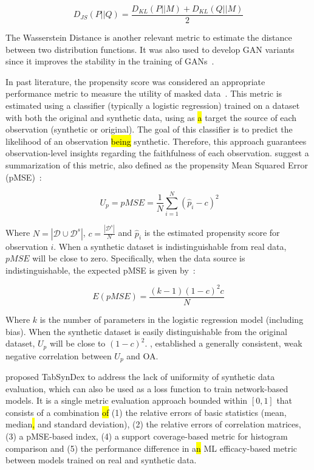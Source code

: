 \begin{equation}
    D_{JS}(P||Q) = \frac{D_{KL}(P||M) + D_{KL}(Q||M)}{2}
\end{equation}

The Wasserstein Distance is another relevant metric to estimate the
distance between two distribution functions. It was also used to develop GAN
variants since it improves the stability in the training of
GANs~\cite{gulrajani2017improved, goncalves2020generation}.

In past literature, the propensity score was considered an appropriate
performance metric to measure the utility of masked data~\cite{woo2009global}.
This metric is estimated using a classifier (typically a logistic regression)
trained on a dataset with both the original and synthetic data, using as \hl{a}
target the source of each observation (synthetic or original). The goal of
this classifier is to predict the likelihood of an observation \hl{being}
synthetic. Therefore, this approach guarantees observation-level insights
regarding the faithfulness of each observation. \cite{woo2009global} suggest
a summarization of this metric, also defined as the propensity Mean Squared Error
(pMSE)~\cite{chundawat2022tabsyndex}:

\begin{equation}~\label{ep:propensity}
    U_p = pMSE = \frac{1}{N} \sum^N_{i=1}{(\hat{p}_i - c)}^2
\end{equation}

Where $N = |\mathcal{D} \cup \mathcal{D}^s|$, $c = \frac{|\mathcal{D}^s|}{N}$
and $\hat{p}_i$ is the estimated propensity score for observation $i$. When a
synthetic dataset is indistinguishable from real data, $pMSE$ will be close to
zero. Specifically, when the data source is indistinguishable, the expected
pMSE is given by~\cite{snoke2018general}:

\begin{equation}
    E(pMSE) = \frac{(k-1)(1-c)^2c}{N}
\end{equation}

Where $k$ is the number of parameters in the logistic regression model
(including bias). When the synthetic dataset is easily distinguishable from
the original dataset, $U_p$ will be close to ${(1-c)}^2$.
\cite{dankar2021fake}, established a generally consistent, weak negative
correlation between $U_p$ and OA\@.

\cite{chundawat2022tabsyndex} proposed TabSynDex to address the lack of
uniformity of synthetic data evaluation, which can also be used as a loss
function to train network-based models. It is a single metric evaluation
approach bounded within $[0,1]$ that consists of a combination \hl{of} (1) the
relative errors of basic statistics (mean, median\hl{,} and standard deviation), (2)
the relative errors of correlation matrices, (3) a pMSE-based index, (4) a
support coverage-based metric for histogram comparison and (5) the performance
difference in a\hl{n} ML efficacy-based metric between models trained on real and
synthetic data.


